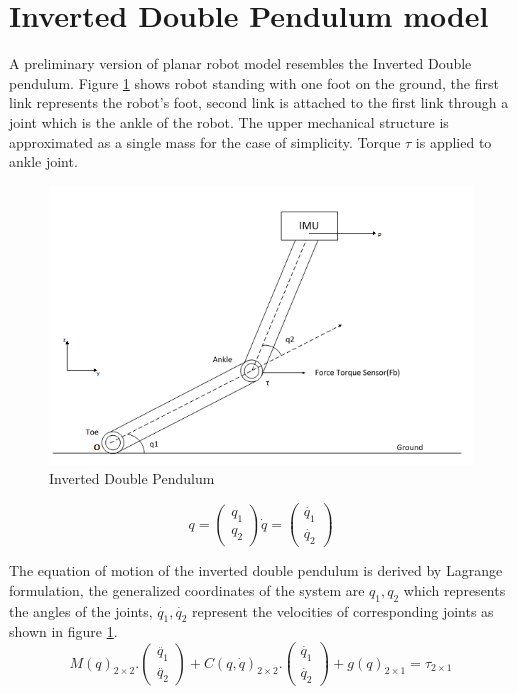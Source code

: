 \section{Inverted Double Pendulum model} 
A preliminary version of planar robot model resembles the Inverted Double pendulum. Figure \ref{fig:idp} shows robot standing with one foot on the ground, the first link represents the robot's foot, second link is attached to the first link through a joint which is the ankle of the robot. The upper mechanical structure is approximated as a single mass for the case of simplicity. Torque $\tau$ is applied to ankle joint. 
\begin{figure}[h]
	\centering
	\includegraphics[scale=0.75]{Bilder/doublePendulum1.png}
	\caption{Inverted Double Pendulum}	
	\label{fig:idp}
\end{figure}
\begin{equation}
	 q = 
	\begin{pmatrix}
		q_{1}\\
		q_{2}
	\end{pmatrix}
	 \dot{q} = 
	\begin{pmatrix}
		\dot{q_{1}}\\
		\dot{q_{2}}
	\end{pmatrix}
\end{equation}

The equation of motion of the inverted double pendulum is derived by Lagrange formulation, the generalized coordinates of the system are $q_1,q_2$ which represents the angles of the joints, $\dot{q_1},\dot{q_2}$ represent the velocities of corresponding joints as shown in figure \ref{fig:idp}.
\begin{equation}
	M(q)_{2\times2}.
	\begin{pmatrix}
		\ddot{q_{1}} \\
		\ddot{q_{2}} 
	\end{pmatrix}
	+ C(q,\dot{q})_{2\times2}.
	\begin{pmatrix}
		\dot{q_{1}} \\
		\dot{q_{2}} 
	\end{pmatrix}
	+ g(q)_{2\times 1} = \tau_{2\times 1}
\end{equation}

